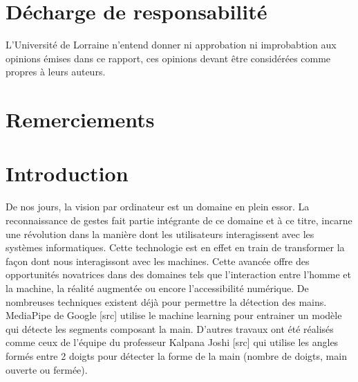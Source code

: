 \documentclass[11pt]{article}
\begin{document}
\newpage \newpage
\section*{Décharge de responsabilité }\bigbreak
L'Université de Lorraine n'entend donner ni approbation  ni improbabtion aux opinions émises dans ce rapport,
ces opinions devant être considérées comme propres à leurs auteurs. \bigbreak

\newpage
\section*{Remerciements}

\newpage
\tableofcontents
\newpage

\setcounter{page}{1}
\section*{Introduction}
De nos jours, la vision par ordinateur est un domaine en plein essor. La reconnaissance de gestes fait partie intégrante de ce domaine et à ce titre, incarne une révolution dans la manière dont les utilisateurs interagissent avec les systèmes informatiques. Cette technologie est en effet en train de transformer la façon dont nous interagissont avec les machines. Cette avancée offre des opportunités novatrices dans des domaines tels que l'interaction entre l'homme et la machine, 
la réalité augmentée ou encore l'accessibilité numérique.
De nombreuses techniques existent déjà pour permettre la détection des mains. MediaPipe de Google [src] utilise le machine learning pour entrainer un modèle qui détecte les segments composant la main. D'autres travaux ont été réalisés comme ceux de l'équipe du professeur Kalpana Joshi [src] qui utilise les angles formés entre 2 doigts pour détecter la forme de la main (nombre de doigts, main ouverte ou fermée).\bigbreak
\end{document}
